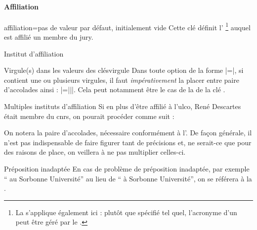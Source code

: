 \paragraph{Affiliation}
\label{sec-inst-de-prov}%
%
%

\begin{docKey}{affiliation}{=}{pas de valeur par défaut,
    initialement vide}
  Cette clé définit l'%
  \footnote{La  s'applique également ici : plutôt que
    spécifié tel quel, l'acronyme d'un  peut être géré par le
    .}  auquel est affilié un membre du jury.
\end{docKey}
\begin{dbexample}{Institut d'affiliation}{}
\begin{preamblecode}[listing options={deletekeywords={[5]supervisor}}]
\end{preamblecode}
\end{dbexample}
%
\begin{dbwarning}{Virgule(s) dans les valeurs des clés}{virgule}
  Dans toute option de la forme |=|, si 
  contient une ou plusieurs virgules, il faut \emph{impérativement} la placer
  entre paire d'accolades ainsi : |={||}|. Cela peut
  notamment être le cas de la  de la clé .
\end{dbwarning}
%
\begin{dbexample}{Multiples instituts d'affiliation}{}
  Si en plus d'être affilié à l'\gls{ulco}, René Descartes était membre du
  \gls{cnrs}, on pourait procéder comme suit :
\begin{preamblecode}
\end{preamblecode}
On notera la paire d'accolades, nécessaire conformément
à l'. De façon générale, il n'est pas indispensable de faire
figurer tant de précisions et, ne serait-ce que pour des raisons de place, on
veillera à ne pas multiplier celles-ci.
\end{dbexample}

\begin{dbwarning}{Préposition inadaptée}{}
  En cas de problème de préposition inadaptée, par exemple
  \enquote{  au Sorbonne Université} au lieu
  de \enquote{  à Sorbonne Université}, on se
  référera à la .
\end{dbwarning}
%
